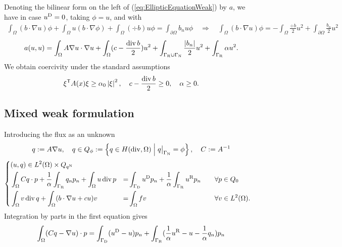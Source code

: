 Denoting the bilinear form on the left of (\ref{eq:EllipticEquationWeak}) by $a$, we have in case $u^{\rm D}=0$, taking $\phi=u$, and with
%
%
\begin{align*}
\int_{\Omega}(b\cdot \nabla u)\phi + \int_{\Omega}u (b\cdot \nabla \phi) + \int_{\Omega}(\div b) u\phi = \int_{\partial\Omega}b_n u\phi 
\quad\Rightarrow\quad \int_{\Omega}(b\cdot \nabla u)\phi = - \int_{\Omega}\frac{\div b}{2} u^2 + \int_{\partial\Omega}\frac{b_n}{2} u^2
\end{align*}
%
%
\begin{align*}
a(u,u) = \int_{\Omega} A\nabla u \cdot\nabla u  + \int_{\Omega}(c-\frac{\operatorname{div} b}{2})u^2 + \int_{\Gamma_{\rm R}\cup\Gamma_{\rm N}}\frac{\left|b_n\right|}{2} u^2+ \int_{\Gamma_{\rm R}}\alpha u^2.
\end{align*}
%
We obtain coercivity under the standard assumptions
%
\begin{equation}\label{eq:}
{\xi}^{\mathsf{T}}A(x)\xi \ge \alpha_0\left|\xi\right|^2,\quad c-\frac{\operatorname{div} b}{2}\ge0,\quad \alpha\ge0.
\end{equation}
%
%
%
\subsection{Mixed weak formulation}\label{subsec:}
%
Introducing the flux as an unknown
%
%
\begin{align*}
q := A\nabla u, \quad q\in Q_{\phi} := \SetDef{q\in \Hdiv}{\Rest{q}{\GammaN}=\phi}, \quad C := A^{-1}\\
\end{align*}
%
%
%
\begin{equation}\label{eq:}
%
\left\{
\begin{aligned}
&(u,q) \in L^2(\Omega)\times Q_{\qN}\\
&\int_{\Omega} Cq\cdot p +  \frac{1}{\alpha}\int_{\GammaR} q_np_n+ \int_{\Omega} u\div p &=& \int_{\GammaD}\uD p_n+ \frac{1}{\alpha}\int_{\GammaR}\uR p_n&\quad &\forall p\in Q_0\\
&\int_{\Omega} v\div q + \int_{\Omega} (b\cdot\nabla u + cu)v&=& \int_{\Omega} fv &\quad&\forall v\in L^2(\Omega).
\end{aligned}
\right.
% 
\end{equation}
%
Integration by parts in the first equation gives
%
\begin{align*}
\int_{\Omega} (Cq-\nabla u)\cdot p =  \int_{\Gamma_{\rm D}}(u^{\rm D}-u) p_n + \int_{\Gamma_{\rm R}}( \frac{1}{\alpha}u^{\rm R} - u -  \frac{1}{\alpha}q_n)p_n 
\end{align*}
%

